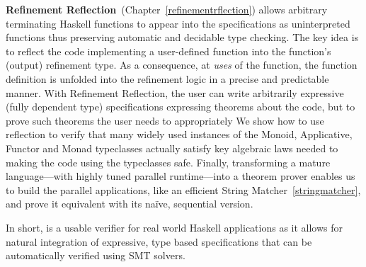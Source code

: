 \textbf{Refinement Reflection}~(Chapter~\ref{refinementrflection})
allows arbitrary terminating Haskell functions to 
appear into the specifications 
as uninterpreted functions thus preserving automatic and decidable 
type checking. 
%
The key idea is to reflect the ​code implementing a​
user-defined function into the function's (output)
refinement type.
%
As a consequence, at \emph{uses} of the function,
the function definition is unfolded into the refinement logic
in a precise and predictable manner.
%
With Refinement Reflection, 
the user can write arbitrarily expressive (fully dependent type)
specifications expressing theorems about the code, 
but to prove such theorems the user needs to appropriately 
%
We show how to use reflection to verify
that many widely used instances of the Monoid,
Applicative, Functor and Monad typeclasses
actually satisfy key algebraic laws needed to
making the code using the typeclasses safe.
%
Finally, transforming a mature language---with
highly tuned parallel runtime---into a theorem
prover  enables us to build the parallel applications, 
like an efficient String Matcher~\ref{stringmatcher}, 
and prove it equivalent with its na\"ive, sequential version.

In short, \toolname is a usable verifier for real world Haskell applications 
as it allows for natural integration of expressive, type based specifications 
that can be automatically verified using SMT solvers. 

